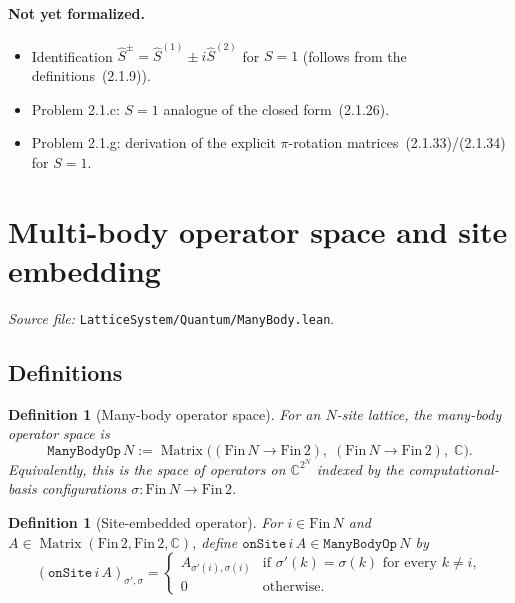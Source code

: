 \documentclass[a4paper,11pt]{article}
\newtheorem{definition}[theorem]{Definition}
\begin{document}
\paragraph{Not yet formalized.}
\begin{itemize}
  \item Identification
    $\hat S^{\pm} = \hat S^{(1)} \pm i\hat S^{(2)}$ for $S = 1$
    (follows from the definitions~(2.1.9)).
  \item Problem 2.1.c: $S = 1$ analogue of the closed form~(2.1.26).
  \item Problem 2.1.g: derivation of the explicit $\pi$-rotation
    matrices~(2.1.33)/(2.1.34) for $S = 1$.
\end{itemize}

\section{Multi-body operator space and site embedding}
\label{sec:manybody}

\emph{Source file:} \texttt{LatticeSystem/Quantum/ManyBody.lean}.

\subsection{Definitions}

\begin{definition}[Many-body operator space]
For an $N$-site lattice, the many-body operator space is
\[
  \texttt{ManyBodyOp}\,N
    := \operatorname{Matrix}\bigl(
      (\mathrm{Fin}\,N \to \mathrm{Fin}\,2),\;
      (\mathrm{Fin}\,N \to \mathrm{Fin}\,2),\;
      \mathbb{C}\bigr).
\]
Equivalently, this is the space of operators on $\mathbb{C}^{2^N}$
indexed by the computational-basis configurations
$\sigma : \mathrm{Fin}\,N \to \mathrm{Fin}\,2$.
\end{definition}

\begin{definition}[Site-embedded operator]
For $i \in \mathrm{Fin}\,N$ and
$A \in \operatorname{Matrix}(\mathrm{Fin}\,2, \mathrm{Fin}\,2, \mathbb{C})$,
define $\texttt{onSite}\,i\,A \in \texttt{ManyBodyOp}\,N$ by
\[
  (\texttt{onSite}\,i\,A)_{\sigma',\sigma}
    = \begin{cases}
        A_{\sigma'(i),\sigma(i)} & \text{if } \sigma'(k) = \sigma(k)
          \text{ for every } k \neq i, \\
        0 & \text{otherwise.}
      \end{cases}
\]
\end{definition}
\end{document}
